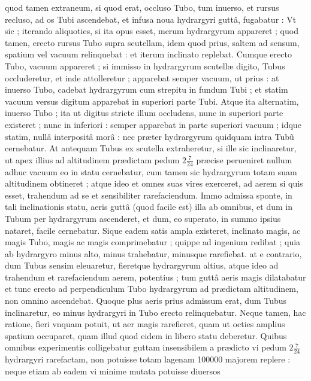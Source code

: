 \documentclass[11pt,a4paper]{article}
\begin{document}


quod tamen extraneum, si quod erat, occluso Tubo, tum inuerso, et rursus recluso, ad os Tubi ascendebat, et infusa noua hydrargyri guttâ, fugabatur : Vt sic ; iterando aliquoties, si ita opus esset, merum hydrargyrum appareret ; quod tamen, erecto rursus Tubo supra scutellam, idem quod prius, saltem ad sensum, spatium vel \ill{} vacuum relinquebat : et iterum inclinato replebat. Cumque erecto Tubo, vacuum appareret ; si immisso in hydrargyrum scutellæ digito, Tubus occluderetur, et inde attolleretur ; apparebat semper vacuum, ut prius : at inuerso Tubo, cadebat hydrargyrum cum strepitu in fundum Tubi ; et statim vacuum versus digitum apparebat in superiori parte Tubi. Atque ita alternatim, inuerso Tubo ; ita ut digitus stricte illum occludens, nunc in superiori parte existeret ; nunc in inferiori : semper apparebat in parte superiori vacuum ; idque statim, nullâ interpositâ morâ : nec præter hydrargyrum quidquam intra Tubũ cernebatur. At antequam Tubus ex scutella extraheretur, si ille sic inclinaretur, ut apex illius ad altitudinem prædictam pedum $2\frac{7}{24}$ præcise perueniret nullum adhuc vacuum eo in statu cernebatur, cum tamen sic hydrargyrum totam suam altitudinem obtineret ; atque ideo et omnes suas vires exerceret, ad aerem si quis esset, trahendum ad se et sensibiliter rarefaciendum. Immo admissa sponte, in tali inclinationis statu, aeris guttâ (quod facile est) illa ab omnibus, et dum in Tubum per hydrargyrum ascenderet, et dum, eo superato, in summo ipsius nataret, facile cernebatur. Sique eadem satis ampla existeret, inclinato magis, ac magis Tubo, magis ac magis comprimebatur ; quippe ad ingenium redibat ; quia ab hydrargyro minus alto, minus trahebatur, minusque rarefiebat. at e contrario, dum Tubus sensim eleuaretur, fieretque hydrargyrum altius, atque ideo ad trahendum et rarefaciendum aerem, potentius ; tum guttâ aeris magis dilatabatur et tunc erecto ad perpendiculum Tubo hydrargyrum ad prædictam altitudinem, non omnino ascendebat. Quoque plus aeris prius admissum erat, dum Tubus inclinaretur, eo minus hydrargyri in Tubo erecto relinquebatur. Neque tamen, hac ratione, fieri vnquam potuit, ut aer magis rarefieret, quam ut octies amplius spatium occuparet,  quam illud quod eidem in libero statu deberetur. Quibus omnibus experimentis colligebatur guttam insensibilem a prædicto vi pedum $2\frac{7}{24}$ hydrargyri rarefactam, non potuisse totam lagenam 100000 majorem replere : neque etiam ab eadem vi minime mutata potuisse diuersos 
\end{document}
